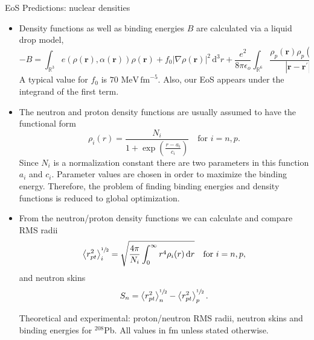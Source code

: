 \documentclass[serif]{beamer}
\newcommand{\bvec}[1]{\boldsymbol{#1}}%
\newcommand{\rb}[1]{\left(#1\right)}%
\newcommand{\abs}[1]{\left|#1\right|}%
\newcommand{\avg}[1]{\left\langle#1\right\rangle}%
\newcommand{\dd}{\,\mathrm{d}}%
\begin{document}
\begin{frame}{}
\begin{columns}[t]
\begin{column}{0.32\paperwidth}
\begin{block}{EoS Predictions: nuclear densities}
\begin{itemize}
\begin{figure}[H]
\begin{center}
\caption{ $^{208}$Pb density functions used to describe the proton (Bonn A: solid red curve and Bonn B: dash dotted blue curve) and neutron (Bonn A: dotted pink curve and Bonn B: dashed green curve) densities.  Experimentally measured $^{208}$Pb neutron and proton density functions. Experimental results from \textit{J. Zenihiro et al., Phys. Rev. C 82 044611, (2010)}.\label{density}}
\end{center}
\end{figure}
\item Density functions as well as binding energies $B$ are calculated via a liquid drop model,
\begin{equation}
-B = \int_{\mathbb{R}^3} e( \rho(\bvec{r}), \alpha(\bvec{r}) ) \rho(\bvec{r}) + f_0 \abs{ \nabla \rho(\bvec{r}) }^2 \dd^3 r + \frac{e^2}{8 \pi \epsilon_o}\int_{\mathbb{R}^6} \frac{ \rho_p(\bvec{r}) \rho_p(\bvec{r}^\prime)}{\abs{\bvec{r}-\bvec{r}^\prime}} \dd^3 r \dd^3 r^\prime.
\label{eq:binding}
\end{equation}
A typical value for $f_0$ is $70$ $\mathrm{MeV} \, \mathrm{fm}^{-5}$. \alert{Also, our EoS appears under the integrand of the first term}.
\item The neutron and proton density functions are usually assumed to have the functional form
\begin{equation}
\rho_i(r) = \frac{N_i}{1+\exp\rb{\frac{r - a_i}{c_i}}} \quad \text{for $i=n,p$}.
\end{equation}
Since $N_i$ is a normalization constant there are two parameters in this function $a_i$ and $c_i$. Parameter values are chosen in order to maximize the binding energy. Therefore, the problem of finding binding energies and density functions is reduced to global optimization.
\item From the neutron/proton density functions we can calculate and compare RMS radii
\begin{equation}
 \avg{r^2_{pt}}_i^{\sfrac{1}{2}} = \sqrt{\frac{4 \pi}{N_i} \int_0^\infty r^4 \rho_i(r) \dd r} \quad \text{for $i=n,p$},
\end{equation}
and neutron skins
\begin{equation}
S_n=\avg{r^2_{pt}}_n^{\sfrac{1}{2}}-\avg{r^2_{pt}}_p^{\sfrac{1}{2}}.
\end{equation}
\begin{table}[H]
\caption{Theoretical and experimental: proton/neutron RMS radii, neutron skins and binding energies for $^{208}$Pb. All values in fm unless stated otherwise.}
\label{table:theo_exp}

\end{table}
\end{itemize}
\end{block}
\end{column}
\end{columns}
\end{frame}
\end{document}
